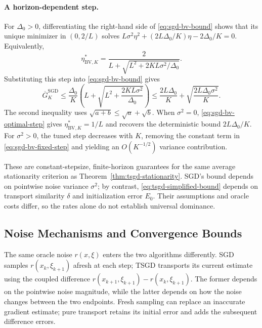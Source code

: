 \paragraph{A horizon-dependent step.}
For $\Delta_0>0$, differentiating the right-hand side of
\eqref{eq:sgd-bv-bound} shows that its unique minimizer in
$(0,2/L)$ solves
$L\sigma^2\eta^2+(2L\Delta_0/K)\eta-2\Delta_0/K=0$.
Equivalently,
\begin{equation}
\label{eq:sgd-bv-optimal-step}
\boxed{\eta_{\mathrm{BV},K}^*
=\frac{2}{L+\sqrt{L^2+2KL\sigma^2/\Delta_0}}}.
\end{equation}
Substituting this step into \eqref{eq:sgd-bv-bound} gives
\begin{equation}
\label{eq:sgd-bv-optimized-bound}
\boxed{\overline G_K^{\mathrm{SGD}}
\leq\frac{\Delta_0}{K}
\left(L+\sqrt{L^2+\frac{2KL\sigma^2}{\Delta_0}}\right)
\leq\frac{2L\Delta_0}{K}
     +\sqrt{\frac{2L\Delta_0\sigma^2}{K}}.}
\end{equation}
The second inequality uses $\sqrt{a+b}\leq\sqrt a+\sqrt b$.
When $\sigma^2=0$, \eqref{eq:sgd-bv-optimal-step} gives
$\eta_{\mathrm{BV},K}^*=1/L$ and recovers the deterministic bound
$2L\Delta_0/K$. For $\sigma^2>0$, the tuned step decreases with
$K$, removing the constant term in \eqref{eq:sgd-bv-fixed-step}
and yielding an $O(K^{-1/2})$ variance contribution.

These are constant-stepsize, finite-horizon guarantees for the same
average stationarity criterion as Theorem~\ref{thm:tsgd-stationarity}.
SGD's bound depends on pointwise noise variance $\sigma^2$; by
contrast, \eqref{eq:tsgd-simplified-bound} depends on transport
similarity $\delta$ and initialization error $E_0$. Their assumptions
and oracle costs differ, so the rates alone do not establish
universal dominance.

\subsection{Noise Mechanisms and Convergence Bounds}
\label{subsec:noise-mechanisms}

The same oracle noise $r(x,\xi)$ enters the two algorithms differently.
SGD samples $r(x_k,\xi_{k+1})$ afresh at each step; TSGD transports
its current estimate using the coupled difference
$r(x_{k+1},\xi_{k+1})-r(x_k,\xi_{k+1})$. The former depends on the
pointwise noise magnitude, while the latter depends on how the noise
changes between the two endpoints. Fresh sampling can replace an
inaccurate gradient estimate; pure transport retains its initial
error and adds the subsequent difference errors.

